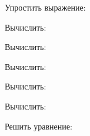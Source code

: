 \begin{listofex}
	\item Упростить выражение:
	\begin{enumcols}[itemcolumns=2]
		\item {}
		\item {}
	\end{enumcols}
	\item Вычислить:
	\begin{enumcols}[itemcolumns=2]
		\item {}
		\item {}
	\end{enumcols}
	\item Вычислить:
	\begin{enumcols}[itemcolumns=4]
		\item {}
		\item {}
		\item {}
		\item {}
		\item {}
		\item {}
		\item {}
		\item {}
	\end{enumcols}
	\item Вычислить:
	\begin{enumcols}[itemcolumns=2]
		\item {}
		\item {}
		\item {}
		\item {}
	\end{enumcols}
	\item Вычислить:
	\begin{enumcols}[itemcolumns=3]
		\item {}
		\item {}
		\item {}
	\end{enumcols}
	\item Вычислить:
	\begin{enumcols}[itemcolumns=3]
		\item {}
		\item {}
		\item {}
	\end{enumcols}
	\item Решить уравнение:
	\begin{enumcols}[itemcolumns=2]
		\item {}
		\item {}
		\item {}
		\item {}
		\item {}
		\item {}
		\item {}
	\end{enumcols}
\end{listofex}
